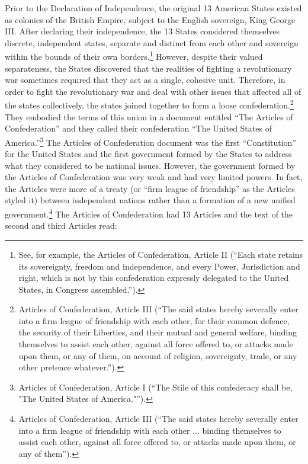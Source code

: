 Prior to the Declaration of Independence, the original 13 American States existed as colonies of the British Empire, subject to the English sovereign, King George III.  After declaring their independence, the 13 States considered themselves discrete, independent states, separate and distinct from each other and sovereign within the bounds of their own borders.\footnote{See, for example, the Articles of Confederation, Article II (``Each state retains its sovereignty, freedom and independence, and every Power, Jurisdiction and right, which is not by this confederation expressly delegated to the United States, in Congress assembled.'').}  However, despite their valued separateness, the States discovered that the realities of fighting a revolutionary war sometimes required that they act as a single, cohesive unit.  Therefore, in order to fight the revolutionary war and deal with other issues that affected all of the states collectively, the states joined together to form a loose confederation.\footnote{Articles of Confederation, Article III (``The said states hereby severally enter into a firm league of friendship with each other, for their common defence, the security of their Liberties, and their mutual and general welfare, binding themselves to assist each other, against all force offered to, or attacks made upon them, or any of them, on account of religion, sovereignty, trade, or any other pretence whatever.'').}  They embodied the terms of this union in a document entitled ``The Articles of Confederation'' and they called their confederation ``The United States of America.''\footnote{Articles of Confederation, Article I (``The Stile of this confederacy shall be, "The United States of America."'').}  The Articles of Confederation document was the first ``Constitution'' for the United States and the first government formed by the States to address what they considered to be national issues.  However, the government formed by the Articles of Confederation was very weak and had very limited powers.  In fact, the Articles were more of a treaty (or ``firm league of friendship'' as the Articles styled it) between independent nations rather than a formation of a new unified government.\footnote{Articles of Confederation, Article III (``The said states hereby severally enter into a firm league of friendship with each other ... binding themselves to assist each other, against all force offered to, or attacks made upon them, or any of them'').}  The Articles of Confederation had 13 Articles and the text of the second and third Articles read: 

